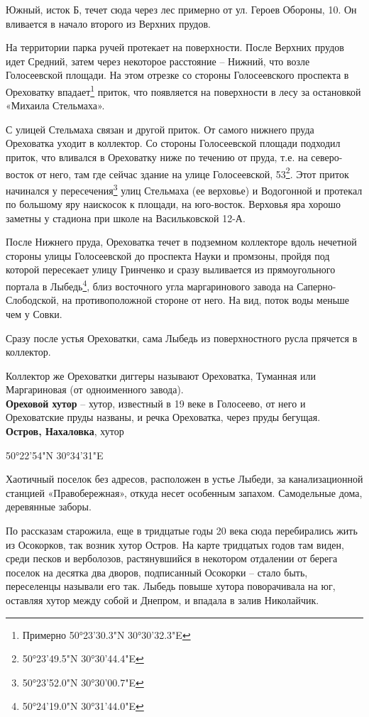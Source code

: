 Южный, исток Б, течет сюда через лес примерно от ул. Героев Обороны, 10. Он вливается в начало второго из Верхних прудов.

На территории парка ручей протекает на поверхности. После Верхних прудов идет Средний, затем через некоторое расстояние – Нижний, что возле Голосеевской площади. На этом отрезке со стороны Голосеевского проспекта в Ореховатку впадает\footnote{Примерно 50°23'30.3"N 30°30'32.3"E} приток, что появляется на поверхности в лесу за остановкой «Михаила Стельмаха». 

С улицей Стельмаха связан и другой приток. 
От самого нижнего пруда Ореховатка уходит в коллектор. Со стороны Голосеевской площади подходил приток, что вливался в Ореховатку ниже по течению от пруда, т.е. на северо-восток от него, там где сейчас здание на улице Голосеевской, 53\footnote{50°23'49.5"N 30°30'44.4"E}. Этот приток начинался у пересечения\footnote{50°23'52.0"N 30°30'00.7"E} улиц Стельмаха (ее верховье) и Водогонной и протекал по большому яру наискосок к площади, на юго-восток. Верховья яра хорошо заметны у стадиона при школе на Васильковской 12-А.

После Нижнего пруда, Ореховатка течет в подземном коллекторе вдоль нечетной стороны улицы Голосеевской до проспекта Науки и промзоны, пройдя под которой пересекает улицу Гринченко и сразу выливается из прямоугольного портала в Лыбедь\footnote{50°24'19.0"N 30°31'44.0"E}, близ восточного угла маргаринового завода на Саперно-Слободской, на противоположной стороне от него. На вид, поток воды меньше чем у Совки.

Сразу после устья Ореховатки, сама Лыбедь из поверхностного русла прячется в коллектор.

Коллектор же Ореховатки диггеры называют Ореховатка, Туманная или Маргариновая (от одноименного завода).\\

\textbf{Ореховой хутор} – хутор, известный в 19 веке в Голосеево, от него и Ореховатские пруды названы, и речка Ореховатка, через пруды бегущая.\\

\textbf{Остров, Нахаловка}, хутор

50°22'54"N 30°34'31"E

Хаотичный поселок без адресов, расположен в устье Лыбеди, за канализационной станцией «Правобережная», откуда несет особенным запахом. Самодельные дома, деревянные заборы.

По рассказам старожила, еще в тридцатые годы 20 века сюда перебирались жить из Осокорков, так возник хутор Остров. На карте тридцатых годов там виден, среди песков и верболозов, растянувшийся в некотором отдалении от берега поселок на десятка два дворов, подписанный Осокорки – стало быть, переселенцы называли его так. Лыбедь повыше хутора поворачивала на юг, оставляя хутор между собой и Днепром, и впадала в залив Николайчик. 

